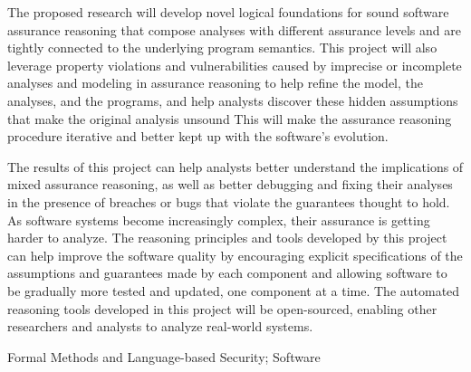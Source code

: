 \documentclass[11pt]{article}
\begin{document}
The proposed research will develop novel logical foundations for sound software assurance reasoning that
compose analyses with different assurance levels and are tightly connected to the underlying program semantics.
%
This project will also leverage property violations and vulnerabilities caused by imprecise or incomplete analyses and modeling in assurance reasoning to help refine the model, the analyses, and the programs, and help analysts discover these hidden assumptions that make the original analysis unsound
This will make the assurance reasoning
procedure iterative and better kept up with the software's evolution.
%



The results of this project can help analysts better understand the implications of mixed assurance reasoning, as well as better debugging and fixing their analyses in the presence of breaches or bugs that violate the guarantees thought to hold.
%
As software systems become increasingly complex, their assurance is getting harder to analyze. The reasoning
principles and tools developed by this project can help improve the software quality by encouraging explicit specifications of the assumptions and guarantees made by each component and allowing software to be gradually more tested and updated, one component at a time.  
%
The automated reasoning tools developed in this project will
be open-sourced, enabling other researchers and analysts to
analyze real-world systems. 


  Formal Methods and Language-based Security; Software
\end{document}
